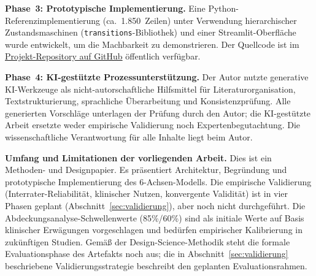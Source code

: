 \documentclass[11pt,a4paper]{article}
\begin{document}
\textbf{Phase~3: Prototypische Implementierung.} Eine Python-Referenzimplementierung (ca.\ 1.850~Zeilen) unter Verwendung hierarchischer Zustandsmaschinen (\texttt{transitions}-Bibliothek) und einer Streamlit-Oberfl\"ache wurde entwickelt, um die Machbarkeit zu demonstrieren. Der Quellcode ist im \href{https://github.com/um-bruch/multiaxial-diagnostic-system}{Projekt-Repository auf GitHub} \"offentlich verf\"ugbar.

\textbf{Phase~4: KI-gest\"utzte Prozessunterst\"utzung.} Der Autor nutzte generative KI-Werkzeuge als nicht-autorschaftliche Hilfsmittel f\"ur Literaturorganisation, Textstrukturierung, sprachliche \"Uberarbeitung und Konsistenzpr\"ufung. Alle generierten Vorschl\"age unterlagen der Pr\"ufung durch den Autor; die KI-gest\"utzte Arbeit ersetzte weder empirische Validierung noch Expertenbegutachtung. Die wissenschaftliche Verantwortung f\"ur alle Inhalte liegt beim Autor.

\textbf{Umfang und Limitationen der vorliegenden Arbeit.} Dies ist ein Methoden- und Designpapier. Es pr\"asentiert Architektur, Begr\"undung und prototypische Implementierung des 6-Achsen-Modells. Die empirische Validierung (Interrater-Reliabilit\"at, klinischer Nutzen, konvergente Validit\"at) ist in vier Phasen geplant (Abschnitt~\ref{sec:validierung}), aber noch nicht durchgef\"uhrt. Die Abdeckungsanalyse-Schwellenwerte (85\%/60\%) sind als initiale Werte auf Basis klinischer Erw\"agungen vorgeschlagen und bed\"urfen empirischer Kalibrierung in zuk\"unftigen Studien. Gem\"a\ss{} der Design-Science-Methodik \citep{Hevner2004, Peffers2007} steht die formale Evaluationsphase des Artefakts noch aus; die in Abschnitt~\ref{sec:validierung} beschriebene Validierungsstrategie beschreibt den geplanten Evaluationsrahmen.
\end{document}
